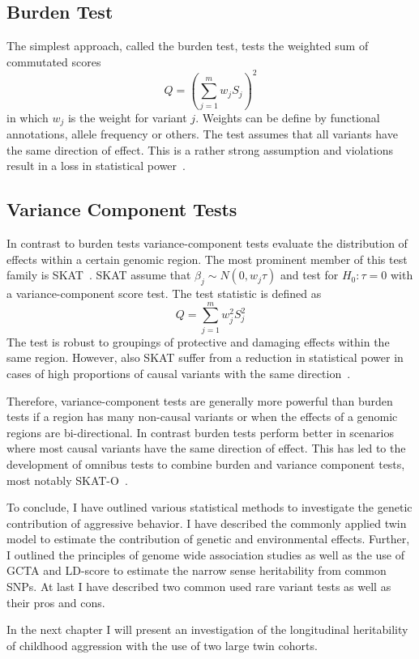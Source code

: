 \documentclass[../header.tex]{subfiles}
\begin{document}
\subsection{Burden Test}
\label{sub:burden_test}
The simplest approach, called the burden test, tests the weighted sum of commutated scores
\begin{equation}\label{eq:burden}
  Q = {(\sum^{m}_{j=1} w_{j} S_{j})}^2
\end{equation}
in which $w_j$ is the weight for variant $j$.
Weights can be define by functional annotations, allele frequency or others.
The test assumes that all variants  have the same direction of effect.
This is a rather strong assumption and violations result in a loss in statistical power~\cite{Derkach2013a}.

\subsection{Variance Component Tests}
\label{sub:variance_component_tests}
In contrast to burden tests variance-component tests evaluate the distribution of effects within a certain genomic region.
The most prominent member of this test family is SKAT~\cite{Wu2011}.
SKAT assume that $\beta_j\sim N(0,w_j\tau)$ and test for $H_0: \tau = 0$ with a variance-component score test.
The test statistic is defined as
\begin{equation}\label{eq:skat}
  Q = \sum^{m}_{j=1} w_{j}^2 S_{j}^2
\end{equation}
The test is robust to groupings of protective and damaging effects within the same region.
However, also SKAT suffer from a reduction in statistical power in cases of high proportions of causal variants with the same direction~\cite{Derkach2013a}.

Therefore, variance-component tests are generally more powerful than burden tests if a region has many non-causal variants or when the effects of a genomic regions are bi-directional.
In contrast burden tests perform better in scenarios where most causal variants have the same direction of effect.
This has led to the development of omnibus tests to combine burden and variance component tests, most notably SKAT-O~\cite{Lee2012}.
\bigskip

To conclude, I have outlined various statistical methods to investigate the genetic contribution of aggressive behavior.
I have described the commonly applied twin model to estimate the contribution of genetic and environmental effects.
Further, I outlined the principles of genome wide association studies as well as the use of GCTA and LD-score to estimate the narrow sense heritability from common SNPs.
At last I have described two common used rare variant tests as well as their pros and cons.

In the next chapter I will present an investigation of the longitudinal heritability of childhood aggression with the use of two large twin cohorts. 
\end{document}
